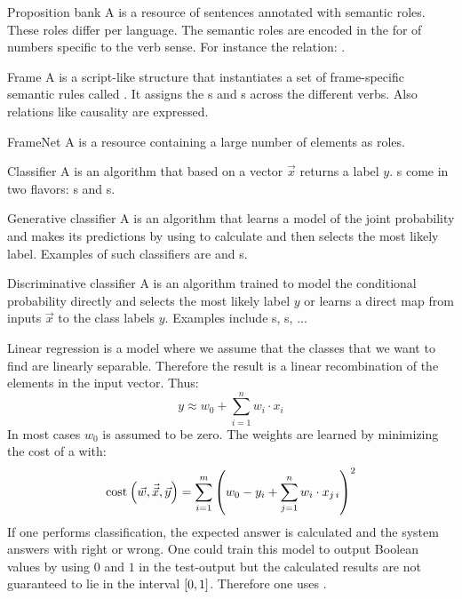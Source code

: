 \begin{df}[ProBank]{Proposition bank}
A \sb{} is a resource of sentences annotated with semantic roles. These roles differ per language. The semantic roles are encoded in the for of numbers specific to the verb sense. For instance the  relation: .
\end{df}
\begin{df}{Frame}
A \sb{} is a script-like structure that instantiates a set of frame-specific semantic rules called . It assigns the s and s across the different verbs. Also relations like causality are expressed.
\end{df}
\begin{df}{FrameNet}
A \sb{} is a resource containing a large number of  elements as roles.
\end{df}
\begin{df}{Classifier}
A \sb{} is an algorithm that based on a vector $\vec{x}$ returns a label $y$. \sb{}s come in two flavors: s and s.
\end{df}
\begin{df}{Generative classifier}
A \sb{} is an algorithm that learns a model of the joint probability  and makes its predictions by using  to calculate  and then selects the most likely label. Examples of such classifiers are  and s.
\end{df}
\begin{df}{Discriminative classifier}
A \sb{} is an algorithm trained to model the conditional probability  directly and selects the most likely label $y$ or learns a direct map from inputs $\vec{x}$ to the class labels $y$. Examples include s, s, ...
\end{df}
\begin{df}{Linear regression}
\sb{} is a model where we assume that the classes that we want to find are linearly separable. Therefore the result is a linear recombination of the elements in the input vector. Thus:
\begin{equation}
y\approx w_0+\displaystyle\sum_{i=1}^{n}w_i\cdot x_i
\end{equation}
In most cases $w_0$ is assumed to be zero. The weights are learned by minimizing the cost of a  with:
\begin{equation}
\mbox{cost}_{}\left(\vec{w},\vec{\vec{x}},\vec{y}\right)=\displaystyle\sum_{i=1}^{m}{\left(w_0-y_i+\displaystyle\sum_{j=1}^{n}w_i\cdot x_{j\,i}\right)}^2
\end{equation}
If one performs classification, the expected answer is calculated and the system answers with right or wrong. One could train this model to output Boolean values by using $0$ and $1$ in the test-output but the calculated results are not guaranteed to lie in the interval $\left[0,1\right]$. Therefore one uses .
\end{df}
